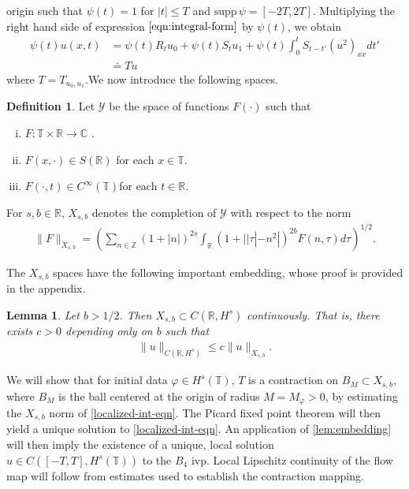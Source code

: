 \documentclass[12pt,reqno]{amsart}
\numberwithin{equation}{section}  %
\numberwithin{figure}{section}
\newcommand{\rr}{\mathbb{R}}
\newcommand{\zz}{\mathbb{Z}}
\newcommand{\cc}{\mathbb{C}}
\newcommand{\ci}{\mathbb{T}}
\newcommand{\wh}{\widehat}
\newcommand{\vp}{\varphi}
\theoremstyle{plain}
\newtheorem{lemma}{Lemma}
\theoremstyle{definition}
\newtheorem{definition}{Definition}
\theoremstyle{remark}
\begin{document}
origin such that $\psi(t) = 1$ for $|t| \le T$ and $\text{supp} \, \psi 
= [-2T, 2T ]$. Multiplying the right hand side of expression
$\eqref{eqn:integral-form}$ by $\psi(t)$, we obtain
%
%
\begin{equation}
  \begin{split}
    \psi(t) u(x,t)
    & = \psi(t) R_{t} u_{0} + \psi(t) S_{t}u_{1} +
    \psi(t) \int_{0}^{t} S_{t-t'}
    (u^{2})_{xx} dt'
    \\
    & \doteq Tu
  \end{split}
  \label{localized-int-eqn}
\end{equation}
where $T=T_{u_0, u_1}$.We now introduce the following spaces. 
%
%
\begin{definition}
  Let $\mathcal{Y}$ be the space of functions $F(\cdot)$ such that
  \begin{enumerate}[(i)]
   \item{$F: \ci \times \rr \to \cc$ }.
   \item{ $F(x, \cdot) \in S(\rr)$ for each $x \in \ci$}.
   \item{ $F(\cdot, t) \in C^{\infty}(\ci)$for each $t \in \rr$}.
  \end{enumerate}
  For $s, b \in \rr$, $X_{s,b}$ denotes the completion of $\mathcal{Y}$ with
  respect to the norm
  \begin{equation}
  \begin{split}
    \|F\|_{X_{s,b}} = \left( \sum_{n \in \zz} (1 + |n|)^{2s} \int_{\rr}
    (1 + | | \tau | - n^{2} |)^{2b} \wh{F}(n, \tau) d \tau\right)^{1/2}.
  \end{split}
  \label{eqn:bous-norm}
  \end{equation}
\end{definition}
%
The $X_{s,b}$ spaces have the following important embedding, whose proof is
provided in the appendix.
%
%
%
%
%
%
%
%
\begin{lemma}
  Let $b > 1/2$. Then $X_{s, b} \subset C(\rr, H^s)$ continuously. That is, there exists $c>0$ depending only on $b$ such that
%
%
\begin{equation*}
\begin{split}
  \| u \|_{C(\rr, H^s) } \le c \| u \|_{X_{s,b}}.
\end{split}
\end{equation*}
%
\label{lem:embedding}
\end{lemma}
%
%
We will 
show that for initial data $\vp \in {H}^s(\ci)$, $T$ is a contraction on $B_M 
\subset {X}_{s,b}$, where $B_M$ is the ball centered at the origin of radius $M = 
M_{\vp}> 0$, by estimating the $X_{s,b}$
norm of \eqref{localized-int-eqn}. The Picard fixed point theorem will
then yield a unique solution to
\eqref{localized-int-eqn}. An application of \autoref{lem:embedding}
will then imply the existence of a unique, local
solution $u \in C([-T, T], H^s(\ci))$ to the $B_4$ ivp. Local Lipschitz continuity of the flow map will follow from estimates used to establish the contraction mapping. %
%
%
%
%
%
%
%
%
%
\end{document}
